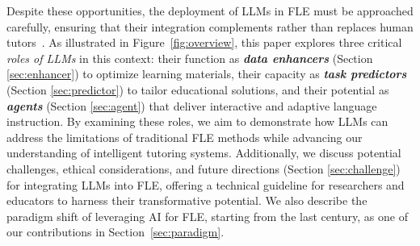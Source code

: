 Despite these opportunities, the deployment of LLMs in FLE must be approached carefully, ensuring that their integration complements rather than replaces human tutors~\cite{jeon2023large}. As illustrated in Figure~\ref{fig:overview}, this paper explores three critical \textit{roles of LLMs} in this context: their function as \textbf{\textit{data enhancers}} (Section \ref{sec:enhancer}) to optimize learning materials, their capacity as \textbf{\textit{task predictors}} (Section \ref{sec:predictor}) to tailor educational solutions, and their potential as \textbf{\textit{agents}} (Section \ref{sec:agent}) that deliver interactive and adaptive language instruction. By examining these roles, we aim to demonstrate how LLMs can address the limitations of traditional FLE methods while advancing our understanding of intelligent tutoring systems. Additionally, we discuss potential challenges, ethical considerations, and future directions (Section \ref{sec:challenge}) for integrating LLMs into FLE, offering a technical guideline for researchers and educators to harness their transformative potential. We also describe the paradigm shift of leveraging AI for FLE, starting from the last century, as one of our contributions in Section~\ref{sec:paradigm}.


